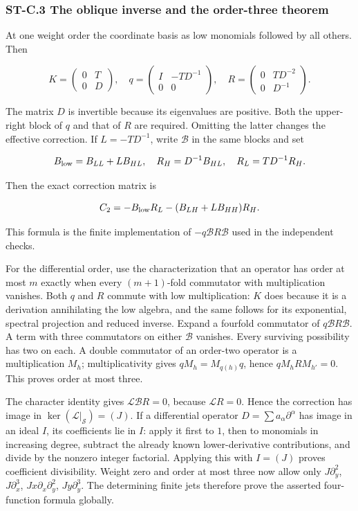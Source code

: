 \hypertarget{st-c.3-the-oblique-inverse-and-the-order-three-theorem}{%
\subsubsection{ST-C.3 The oblique inverse and the order-three theorem}\label{st-c.3-the-oblique-inverse-and-the-order-three-theorem}}

At one weight order the coordinate basis as low monomials followed by all others. Then

\[
K=\begin{pmatrix}0&T\\0&D\end{pmatrix},\quad
q=\begin{pmatrix}I&-TD^{-1}\\0&0\end{pmatrix},\quad
R=\begin{pmatrix}0&TD^{-2}\\0&D^{-1}\end{pmatrix}.
\]

The matrix \(D\) is invertible because its eigenvalues are positive. Both the upper-right block of \(q\) and that of \(R\) are required. Omitting the latter changes the effective correction. If \(L=-TD^{-1}\), write \(\mathscr B\) in the same blocks and set

\[
B_{\rm low}=B_{LL}+LB_{HL},\quad
R_H=D^{-1}B_{HL},\quad R_L=TD^{-1}R_H.
\]

Then the exact correction matrix is

\[
C_2=-B_{\rm low}R_L-(B_{LH}+LB_{HH})R_H.
\]

This formula is the finite implementation of \(-q\mathscr BR\mathscr B\) used in the independent checks.

For the differential order, use the characterization that an operator has order at most \(m\) exactly when every \((m+1)\)-fold commutator with multiplication vanishes. Both \(q\) and \(R\) commute with low multiplication: \(K\) does because it is a derivation annihilating the low algebra, and the same follows for its exponential, spectral projection and reduced inverse. Expand a fourfold commutator of \(q\mathscr BR\mathscr B\). A term with three commutators on either \(\mathscr B\) vanishes. Every surviving possibility has two on each. A double commutator of an order-two operator is a multiplication \(M_h\); multiplicativity gives \(qM_h=M_{q(h)}q\), hence \(qM_hR M_{h'}=0\). This proves order at most three.

The character identity gives \(\mathcal L\mathscr BR=0\), because \(\mathcal LR=0\). Hence the correction has image in \(\ker(\mathcal L|_{\mathcal S})=(J)\). If a differential operator \(D=\sum a_\alpha\partial^\alpha\) has image in an ideal \(I\), its coefficients lie in \(I\): apply it first to \(1\), then to monomials in increasing degree, subtract the already known lower-derivative contributions, and divide by the nonzero integer factorial. Applying this with \(I=(J)\) proves coefficient divisibility. Weight zero and order at most three now allow only \(J\partial_y^2\), \(J\partial_x^3\), \(Jx\partial_x\partial_y^2\), \(Jy\partial_y^3\). The determining finite jets therefore prove the asserted four-function formula globally.

